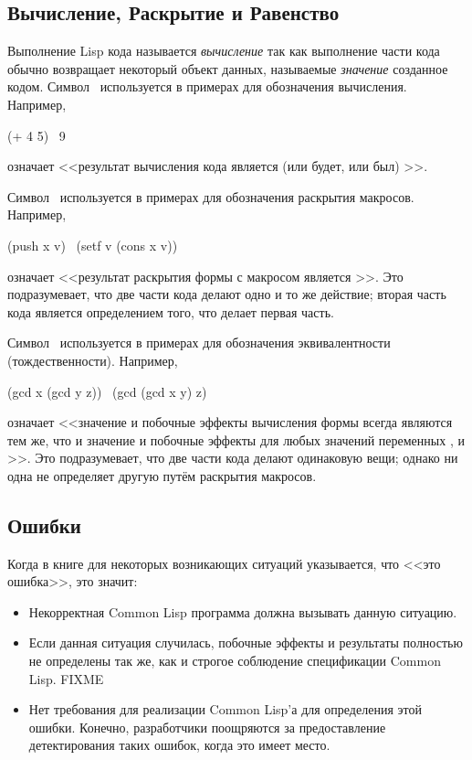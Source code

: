 \subsection{Вычисление, Раскрытие и Равенство}

Выполнение Lisp кода называется \emph{вычисление} так как выполнение части кода
обычно возвращает некоторый объект данных, называемые \emph{значение} созданное
кодом. Символ \EV\ используется в примерах для обозначения вычисления.
Например,
\begin{lisp}
(+ 4 5) \EV\ 9
\end{lisp}
означает <<результат вычисления кода  является (или будет, или был)
>>.

Символ \EX\ используется в примерах для обозначения раскрытия макросов.
Например,
\begin{lisp}
(push x v) \EX\ (setf v (cons x v))
\end{lisp}
означает <<результат раскрытия формы с макросом 
является >>. Это подразумевает, что две части кода
делают одно и то же действие; вторая часть кода является определением того, что
делает первая часть.

Символ \EQ\ используется в примерах для обозначения эквивалентности
(тождественности).
Например,
\begin{lisp}
(gcd x (gcd y z)) \EQ\ (gcd (gcd x y) z)
\end{lisp}
означает <<значение и побочные эффекты вычисления формы  всегда
являются тем же, что и значение и побочные эффекты  для любых
значений переменных ,  и >>.
Это подразумевает, что две части кода делают одинаковую вещи; однако ни одна не
определяет другую путём раскрытия макросов.

\subsection{Ошибки}
\label{INTRO-ERRORS}

Когда в книге для некоторых возникающих ситуаций указывается, что <<это
ошибка>>, это значит: 

\begin{itemize}
\item Некорректная Common Lisp программа должна вызывать данную ситуацию.

\item Если данная ситуация случилась, побочные эффекты и результаты полностью не
определены так же, как и строгое соблюдение спецификации Common Lisp. FIXME

\item Нет требования для реализации Common Lisp'а для определения этой
ошибки. Конечно, разработчики поощряются за предоставление детектирования таких
ошибок, когда это имеет место.
\end{itemize}

